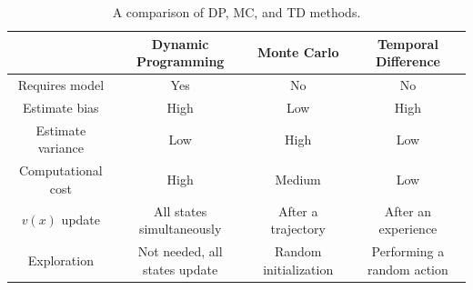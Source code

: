 \begin{table}[H]
\caption{A comparison of DP, MC, and TD methods.}
\label{tab:dc_mc_td}
\centering
{\scriptsize
\begin{tabular}{c|c|c|c}
 & \textbf{Dynamic Programming}	& \textbf{Monte Carlo} & \textbf{Temporal Difference}\\
\hline
Requires model	     	& Yes			& No     &  No \\
Estimate bias           & High			& Low    &  High \\
Estimate variance	    & Low			& High   &  Low \\
Computational cost		& High			& Medium &  Low \\
$v(x)$ update      	& All states simultaneously   & After a trajectory  &  After an experience \\
Exploration             & Not needed, all states update   & Random initialization  &  Performing a random action \\
\end{tabular}}
\end{table}




